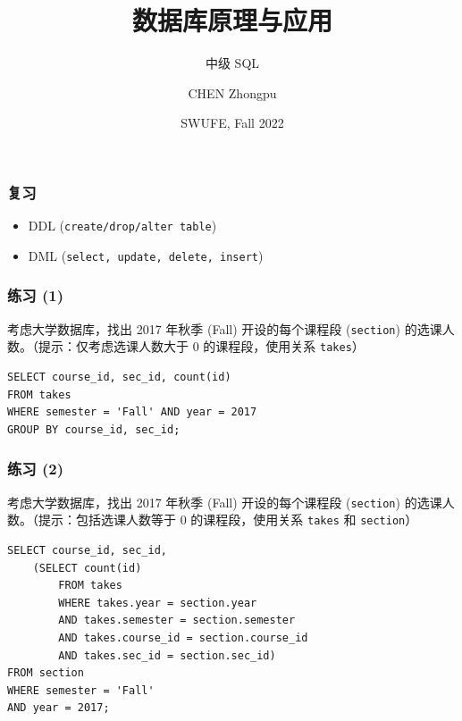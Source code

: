 \documentclass[aspectratio=169, 14pt]{beamer}
\title[Database Principles and Applications] %
{数据库原理与应用}
\subtitle{中级 SQL}
\author[CHEN Zhongpu] %
{CHEN Zhongpu}
\institute[] %
{
  School of Computing and Artificial Intelligence \\
  \href{mailto:zpchen@swufe.edu.cn}{zpchen@swufe.edu.cn}
}
\date[] %
{SWUFE, Fall 2022}
\begin{document}
\frame{\titlepage}

\begin{frame}[fragile]
\frametitle{复习}
\begin{itemize}
    \item DDL (\texttt{create/drop/alter table})
    \item DML (\texttt{select, update, delete, insert})
\end{itemize}


\end{frame}

\begin{frame}[fragile]
    \frametitle{练习 (1)}
考虑大学数据库，找出 2017 年秋季 (Fall) 开设的每个课程段 (\texttt{section}) 的选课人数。（提示：仅考虑选课人数大于 0 的课程段，使用关系 \texttt{takes}）

\pause
\begin{verbatim}
SELECT course_id, sec_id, count(id)
FROM takes
WHERE semester = 'Fall' AND year = 2017
GROUP BY course_id, sec_id;
\end{verbatim}

\end{frame}

\begin{frame}[fragile]
    \frametitle{练习 (2)}
考虑大学数据库，找出 2017 年秋季 (Fall) 开设的每个课程段 (\texttt{section}) 的选课人数。（提示：包括选课人数等于 0 的课程段，使用关系 \texttt{takes} 和 \texttt{section}）

\pause
    
\begin{verbatim}
SELECT course_id, sec_id,
    (SELECT count(id)
        FROM takes
        WHERE takes.year = section.year
        AND takes.semester = section.semester
        AND takes.course_id = section.course_id
        AND takes.sec_id = section.sec_id)
FROM section
WHERE semester = 'Fall'
AND year = 2017;
\end{verbatim}

\end{frame}
\end{document}

